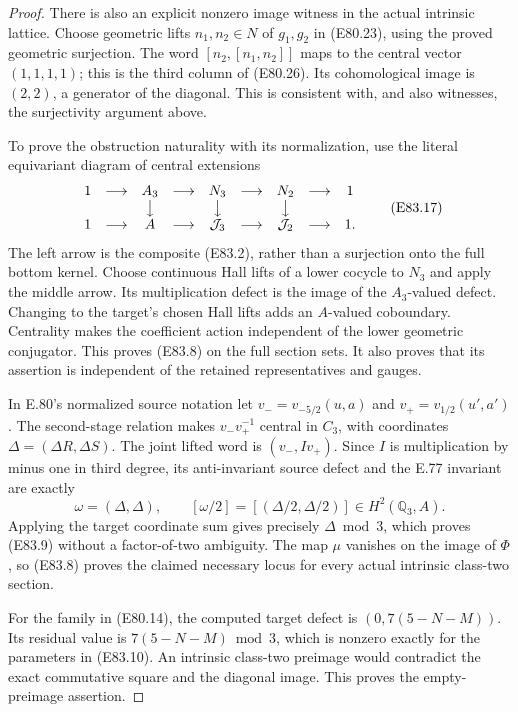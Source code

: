 \begin{proof}
There is also an explicit nonzero image witness
in the actual intrinsic lattice. Choose geometric
lifts $n_1,n_2\in N$ of $g_1,g_2$ in (E80.23),
using the proved geometric surjection. The word
$[n_2,[n_1,n_2]]$ maps to the central vector
$(1,1,1,1)$; this is the third column of (E80.26).
Its cohomological image is $(2,2)$, a generator
of the diagonal. This is consistent with, and
also witnesses, the surjectivity argument above.

To prove the obstruction naturality with its
normalization, use the literal equivariant
diagram of central extensions
\[
 \begin{array}{ccccccccc}
 1&\longrightarrow&A_3&\longrightarrow&N_3&\longrightarrow&N_2&\longrightarrow&1\\
 &&\big\downarrow&&\big\downarrow&&\big\downarrow\\
 1&\longrightarrow&A&\longrightarrow&\mathcal J_3
       &\longrightarrow&\mathcal J_2&\longrightarrow&1.
 \end{array}
 \tag{E83.17}
\]
The left arrow is the composite (E83.2), rather
than a surjection onto the full bottom kernel.
Choose continuous Hall lifts of a lower cocycle
to $N_3$ and apply the middle arrow. Its
multiplication defect is the image of the
$A_3$-valued defect. Changing to the target's
chosen Hall lifts adds an $A$-valued coboundary.
Centrality makes the coefficient action independent
of the lower geometric conjugator. This proves
(E83.8) on the full section sets. It also proves
that its assertion is independent of the retained
representatives and gauges.

In E.80's normalized source notation let
$v_-=v_{-5/2}(u,a)$ and
$v_+=v_{1/2}(u',a')$. The second-stage relation
makes $v_-v_+^{-1}$ central in $C_3$, with
coordinates $\Delta=(\Delta R,\Delta S)$.
The joint lifted word is $(v_-,Iv_+)$.
Since $I$ is multiplication by minus one in
third degree, its anti-invariant source defect
and the E.77 invariant are exactly
\[
 \omega=(\Delta,\Delta),\qquad
       [\omega/2]=[(\Delta/2,\Delta/2)]\in H^2(\mathbb Q_3,A).
 \tag{E83.18}
\]
Applying the target coordinate sum gives precisely
$\Delta\bmod3$, which proves (E83.9) without a
factor-of-two ambiguity. The map $\mu$ vanishes
on the image of $\Phi$, so (E83.8) proves the
claimed necessary locus for every actual
intrinsic class-two section.

For the family in (E80.14), the computed target
defect is $(0,7(5-N-M))$. Its residual value is
$7(5-N-M)\bmod3$, which is nonzero exactly
for the parameters in (E83.10). An intrinsic
class-two preimage would contradict the exact
commutative square and the diagonal image.
This proves the empty-preimage assertion.


\end{proof}

